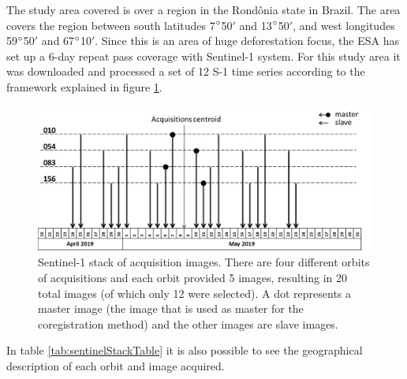 The study area covered is over a region in the Rondônia state in Brazil. The area covers the region between south latitudes 7$\degree$50$'$ and 13$\degree$50$'$, and west longitudes 59$\degree$50$'$ and 67$\degree$10$'$. Since this is an area of huge deforestation focus, the ESA has set up a 6-day repeat pass coverage with Sentinel-1 system. For this study area it was downloaded and processed a set of 12 S-1 time series according to the framework explained in figure \ref{fig:sentinelStack}.

\begin{figure}[h]
    \centering
    \includegraphics[width=\linewidth]{Cap2-Methods/sentinelstack.jpg}
    \caption{Sentinel-1 stack of acquisition images. There are four different orbits of acquisitions and each orbit provided 5 images, resulting in 20 total images (of which only 12 were selected). A dot represents a master image (the image that is used as master for the coregistration method) and the other images are slave images.}
    \label{fig:sentinelStack}
\end{figure}{}

In table \ref{tab:sentinelStackTable} it is also possible to see the geographical description of each orbit and image acquired.

